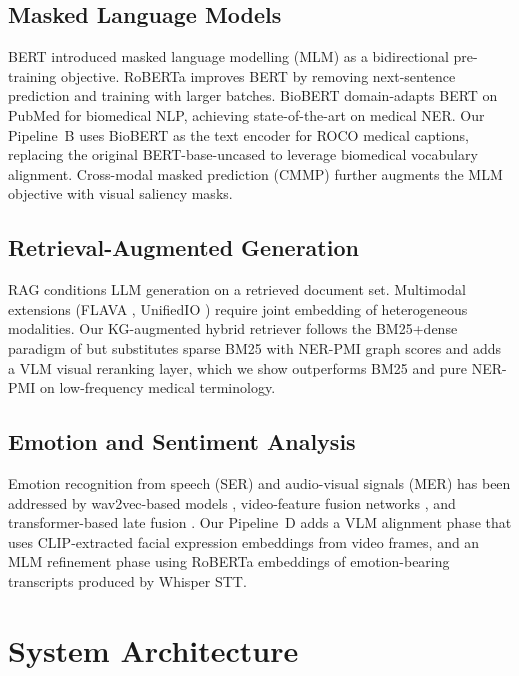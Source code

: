 \documentclass[10pt,conference]{IEEEtran}
\theoremstyle{ieeethm}
\theoremstyle{ieeedef}
\theoremstyle{ieeeremark}
\begin{document}
\subsection{Masked Language Models}

BERT \cite{devlin2019bert} introduced masked language modelling (MLM) as a bidirectional pre-training objective. RoBERTa \cite{liu2019roberta} improves BERT by removing next-sentence prediction and training with larger batches. BioBERT \cite{lee2020biobert} domain-adapts BERT on PubMed for biomedical NLP, achieving state-of-the-art on medical NER. Our Pipeline~B uses BioBERT as the text encoder for ROCO medical captions, replacing the original BERT-base-uncased to leverage biomedical vocabulary alignment. Cross-modal masked prediction (CMMP) further augments the MLM objective with visual saliency masks.

\subsection{Retrieval-Augmented Generation}

RAG \cite{lewis2020retrieval} conditions LLM generation on a retrieved document set. Multimodal extensions (FLAVA \cite{singh2022flava}, UnifiedIO \cite{lu2022unified}) require joint embedding of heterogeneous modalities. Our KG-augmented hybrid retriever follows the BM25+dense paradigm of \cite{karpukhin2020dense} but substitutes sparse BM25 with NER-PMI graph scores and adds a VLM visual reranking layer, which we show outperforms BM25 and pure NER-PMI on low-frequency medical terminology.

\subsection{Emotion and Sentiment Analysis}

Emotion recognition from speech (SER) and audio-visual signals (MER) has been addressed by wav2vec-based models \cite{pepino2021emotion}, video-feature fusion networks \cite{zhang2023multimodal}, and transformer-based late fusion \cite{tsai2019multimodal}. Our Pipeline~D adds a VLM alignment phase that uses CLIP-extracted facial expression embeddings from video frames, and an MLM refinement phase using RoBERTa embeddings of emotion-bearing transcripts produced by Whisper STT.

\section{System Architecture}
\label{sec:architecture}
\end{document}
